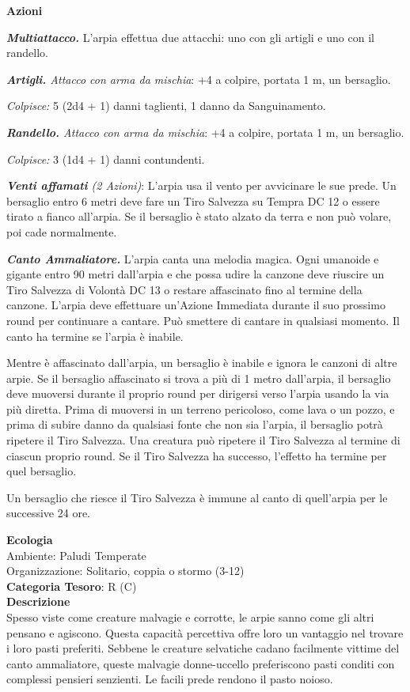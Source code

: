 \begin{multicols}{2}
{\textbf{Azioni}

\emph{\textbf{Multiattacco.}} L'arpia effettua due attacchi: uno con gli artigli e uno con il randello.

\emph{\textbf{Artigli.} Attacco con arma da mischia}: +4 a colpire, portata 1 m, un bersaglio.

\emph{Colpisce:} 5 (2d4 + 1) danni taglienti, 1 danno da Sanguinamento.

\emph{\textbf{Randello.} Attacco con arma da mischia}: +4 a colpire, portata 1 m, un bersaglio.

\emph{Colpisce:} 3 (1d4 + 1) danni contundenti.

\emph{\textbf{Venti affamati} (2 Azioni)}: L'arpia usa il vento per avvicinare le sue prede. Un bersaglio entro 6 metri deve fare un Tiro Salvezza su Tempra DC 12 o essere tirato a fianco all'arpia. Se il bersaglio è stato alzato da terra e non può volare, poi cade normalmente.

\emph{\textbf{Canto Ammaliatore.}} L'arpia canta una melodia magica. Ogni umanoide e gigante entro 90 metri dall'arpia e che possa udire la canzone deve riuscire un Tiro Salvezza di Volontà DC 13 o restare affascinato fino al termine della canzone. L'arpia deve effettuare un'Azione Immediata durante il suo prossimo round per continuare a cantare. Può smettere di cantare in qualsiasi momento. Il canto ha termine se l'arpia è inabile.

Mentre è affascinato dall'arpia, un bersaglio è inabile e ignora le canzoni di altre arpie. Se il bersaglio affascinato si trova a più di 1 metro dall'arpia, il bersaglio deve muoversi durante il proprio round per dirigersi verso l'arpia usando la via più diretta. Prima di muoversi in un terreno pericoloso, come lava o un pozzo, e prima di subire danno da qualsiasi fonte che non sia l'arpia, il bersaglio potrà ripetere il Tiro Salvezza. Una creatura può ripetere il Tiro Salvezza al termine di ciascun proprio round. Se il Tiro Salvezza ha successo, l'effetto ha termine per quel bersaglio.

Un bersaglio che riesce il Tiro Salvezza è immune al canto di quell'arpia per le successive 24 ore.

\textbf{Ecologia}\\
Ambiente: Paludi Temperate\\
Organizzazione: Solitario, coppia o stormo (3-12)\\
\textbf{Categoria Tesoro}: R (C)\\
\textbf{Descrizione}\\
Spesso viste come creature malvagie e corrotte, le arpie sanno come gli altri pensano e agiscono. Questa capacità percettiva offre loro un vantaggio nel trovare i loro pasti preferiti. Sebbene le creature selvatiche cadano facilmente vittime del canto ammaliatore, queste malvagie donne-uccello preferiscono pasti conditi con complessi pensieri senzienti. Le facili prede rendono il pasto noioso.

}
\end{multicols}
